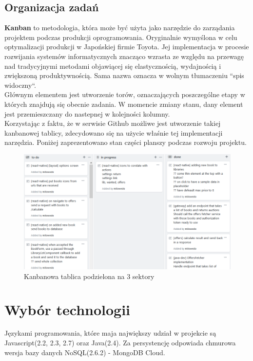 \subsection{Organizacja zadań}
\textbf{Kanban} to metodologia, która może być użyta jako narzędzie do zarządania projektem podczas produkcji oprogramowania. Oryginalnie wymyślona w celu optymalizacji produkcji w Japońskiej firmie Toyota. Jej implementacja w procesie rozwijania systemów informatycznych znacząco wzrasta ze względu na przewagę nad tradycyjnymi metodami objawiącej się elastycznością, wydajnością i zwiększoną produktywnością. Sama nazwa oznacza w wolnym tłumaczeniu ``spis widoczny``.\cite{kanban}\\ Głównym elementem jest utworzenie torów, oznaczających poszczególne etapy w których znajdują się obecnie zadania. W momencie zmiany stanu, dany element jest przemieszczany do nastepnej w kolejności kolumny.\\
Korzystając z faktu, że w serwisie Github możliwe jest utworzenie takiej kanbanowej tablicy, zdecydowano się na użycie właśnie tej implementacji narzędzia. Poniżej zaprezentowano stan części planszy podczas rozwoju projektu.
\begin{figure}[H]
	\centering
	\includegraphics[width=\linewidth]{kanban.png}
	\caption{Kanbanowa tablica podzielona na 3 sektory}
\end{figure}


\section{Wybór technologii}
Językami programowania, które maja największy udział w projekcie są Javascript(2.2, 2.3, 2.7) oraz Java(2.4). Za persystencję odpowiada chmurowa wersja bazy danych NoSQL(2.6.2) - MongoDB Cloud.\\

